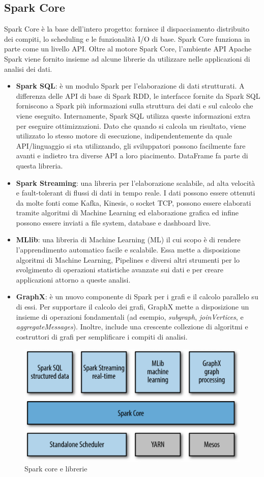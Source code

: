 \subsection{Spark Core}
Spark Core è la base dell'intero progetto: fornisce il dispacciamento distribuito dei compiti, lo scheduling e le funzionalità I/O di base. Spark Core funziona in parte come un livello API. Oltre al motore Spark Core, l’ambiente API Apache Spark viene fornito insieme ad alcune librerie da utilizzare nelle applicazioni di analisi dei dati.
\begin{itemize}
    \item \textbf{Spark SQL}: è un modulo Spark per l'elaborazione di dati strutturati. A differenza delle API di base di Spark RDD, le interfacce fornite da Spark SQL forniscono a Spark più informazioni sulla struttura dei dati e sul calcolo che viene eseguito. Internamente, Spark SQL utilizza queste informazioni extra per eseguire ottimizzazioni. Dato che quando si calcola un risultato, viene utilizzato lo stesso motore di esecuzione, indipendentemente da quale API/linguaggio si sta utilizzando, gli sviluppatori possono facilmente fare avanti e indietro tra diverse API a loro piacimento. DataFrame fa parte di questa libreria.
    \item \textbf{Spark Streaming}: una libreria per l'elaborazione scalabile, ad alta velocità e fault-tolerant di flussi di dati in tempo reale.  I dati possono essere ottenuti da molte fonti come Kafka, Kinesis, o socket TCP, possono essere elaborati tramite algoritmi di Machine Learning ed elaborazione grafica ed infine possono essere inviati a file system, database e dashboard live.
    \item \textbf{MLlib}: una libreria di Machine Learning (ML) il cui scopo è di rendere l'apprendimento automatico facile e scalabile. Essa mette a disposizione algoritmi di Machine Learning, Pipelines e diversi altri strumenti per lo svolgimento di operazioni statistiche avanzate sui dati e per creare applicazioni attorno a queste analisi.
    \item \textbf{GraphX}: è un nuovo componente di Spark per i grafi e il calcolo parallelo su di essi. Per supportare il calcolo dei grafi, GraphX mette a disposizione un insieme di operazioni fondamentali (ad esempio, \textit{subgraph}, \textit{joinVertices}, e \textit{aggregateMessages}). Inoltre, include una crescente collezione di algoritmi e costruttori di grafi per semplificare i compiti di analisi.
\end{itemize}

\begin{figure}[hbt!]
    \centering
    \includegraphics[width=1\textwidth]{img/sparkcore.png}
    \caption{Spark core e librerie}
    \label{fig:spark_core}
\end{figure}
\newpage

